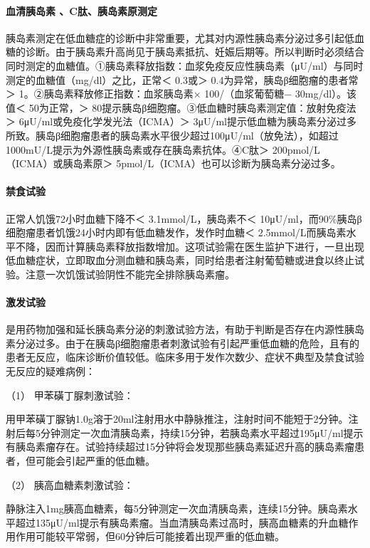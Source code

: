 \paragraph{血清胰岛素 、C肽、胰岛素原测定}

胰岛素测定在低血糖症的诊断中非常重要，尤其对内源性胰岛素分泌过多引起低血糖的诊断。由于胰岛素升高尚见于胰岛素抵抗、妊娠后期等。所以判断时必须结合同时测定的血糖值。①胰岛素释放指数：血浆免疫反应性胰岛素（μU/ml）与同时测定的血糖值（mg/dl）之比，正常＜
0.3或＞ 0.4为异常，胰岛β细胞瘤的患者常＞
1。②胰岛素释放修正指数：血浆胰岛素× 100/（血浆葡萄糖− 30mg/dl）。该值＜
50为正常，＞ 80提示胰岛β细胞瘤。③低血糖时胰岛素测定值：放射免疫法＞
6μU/ml或免疫化学发光法（ICMA）＞
3μU/ml提示低血糖为胰岛素分泌过多所致。胰岛β细胞瘤患者的胰岛素水平很少超过100μU/ml（放免法），如超过1000mU/L提示为外源性胰岛素或存在胰岛素抗体。④C肽＞
200pmol/L （ICMA）或胰岛素原＞
5pmol/L（ICMA）也可以诊断为胰岛素分泌过多。

\paragraph{禁食试验}

正常人饥饿72小时血糖下降不＜ 3.1mmol/L，胰岛素不＜
10μU/ml，而90\%胰岛β细胞瘤患者饥饿24小时内即有低血糖发作，发作时血糖＜
2.5mmol/L而胰岛素水平不降，因而计算胰岛素释放指数增加。这项试验需在医生监护下进行，一旦出现低血糖症状，立即取血分测血糖和胰岛素，同时给患者注射葡萄糖或进食以终止试验。注意一次饥饿试验阴性不能完全排除胰岛素瘤。

\paragraph{激发试验}

是用药物加强和延长胰岛素分泌的刺激试验方法，有助于判断是否存在内源性胰岛素分泌过多。由于在胰岛β细胞瘤患者刺激试验有引起严重低血糖的危险，且有的患者无反应，临床诊断价值较低。临床多用于发作次数少、症状不典型及禁食试验无反应的疑难病例：

\hypertarget{text00120.htmlux5cux23CHP4-13-2-2-5-1}{}
（1） 甲苯磺丁脲刺激试验：

用甲苯磺丁脲钠1.0g溶于20ml注射用水中静脉推注，注射时间不能短于2分钟。注射后每5分钟测定一次血清胰岛素，持续15分钟，若胰岛素水平超过195μU/ml提示有胰岛素瘤存在。试验持续超过15分钟将会发现那些胰岛素延迟升高的胰岛素瘤患者，但可能会引起严重的低血糖。

\hypertarget{text00120.htmlux5cux23CHP4-13-2-2-5-2}{}
（2） 胰高血糖素刺激试验：

静脉注入1mg胰高血糖素，每5分钟测定一次血清胰岛素，连续15分钟。胰岛素水平超过135μU/ml提示有胰岛素瘤。当血清胰岛素过高时，胰高血糖素的升血糖作用作用可能较平常弱，但60分钟后可能接着出现严重的低血糖。

